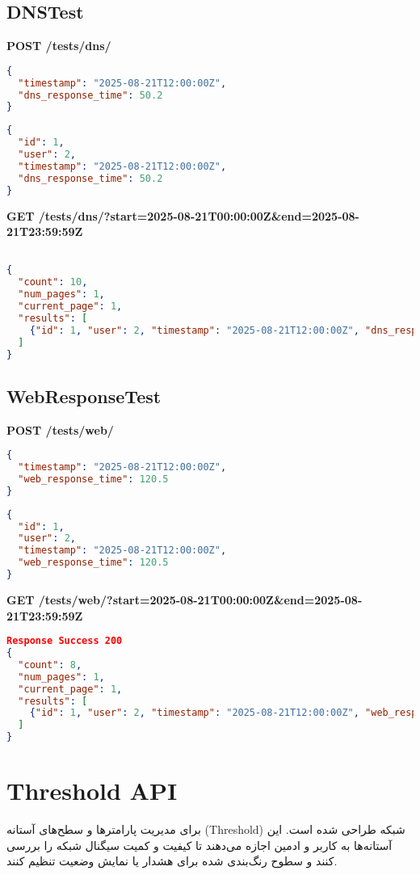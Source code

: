 \documentclass{report}
\begin{document}
\subsection{DNSTest}
\textbf{POST /tests/dns/}
\begin{lstlisting}[language=json]
{
  "timestamp": "2025-08-21T12:00:00Z",
  "dns_response_time": 50.2
}
\end{lstlisting}

\begin{lstlisting}[language=json]
{
  "id": 1,
  "user": 2,
  "timestamp": "2025-08-21T12:00:00Z",
  "dns_response_time": 50.2
}
\end{lstlisting}

\textbf{GET /tests/dns/?start=2025-08-21T00:00:00Z&end=2025-08-21T23:59:59Z}
\begin{lstlisting}[language=json]

{
  "count": 10,
  "num_pages": 1,
  "current_page": 1,
  "results": [
    {"id": 1, "user": 2, "timestamp": "2025-08-21T12:00:00Z", "dns_response_time": 50.2}
  ]
}
\end{lstlisting}

\subsection{WebResponseTest}
\textbf{POST /tests/web/}
\begin{lstlisting}[language=json]
{
  "timestamp": "2025-08-21T12:00:00Z",
  "web_response_time": 120.5
}
\end{lstlisting}

\begin{lstlisting}[language=json]
{
  "id": 1,
  "user": 2,
  "timestamp": "2025-08-21T12:00:00Z",
  "web_response_time": 120.5
}
\end{lstlisting}

\textbf{GET /tests/web/?start=2025-08-21T00:00:00Z&end=2025-08-21T23:59:59Z
}
\begin{lstlisting}[language=json]
Response Success 200
{
  "count": 8,
  "num_pages": 1,
  "current_page": 1,
  "results": [
    {"id": 1, "user": 2, "timestamp": "2025-08-21T12:00:00Z", "web_response_time": 120.5}
  ]
}
\end{lstlisting}
\section{Threshold API}
برای مدیریت پارامترها و سطح‌های آستانه (Threshold) شبکه طراحی شده است. این آستانه‌ها به کاربر و ادمین اجازه می‌دهند تا کیفیت و کمیت سیگنال شبکه  را بررسی کنند و سطوح رنگ‌بندی شده برای هشدار یا نمایش وضعیت تنظیم کنند.
\end{document}
